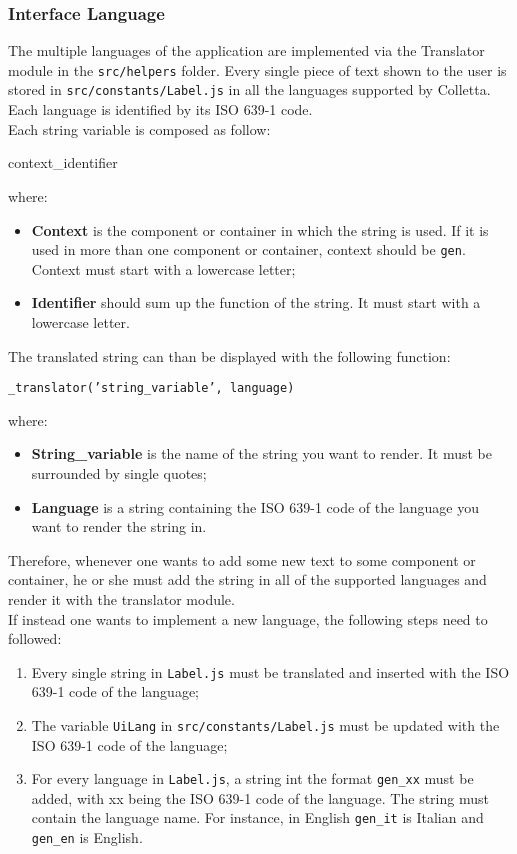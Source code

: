 \subsubsection{Interface Language}
The multiple languages of the application are implemented via the Translator module in the \texttt{src/helpers} folder. Every single piece of text shown to the user is stored in \texttt{src/constants/Label.js} in all the languages supported by Colletta. Each language is identified by its ISO 639-1 code.\\
Each string variable is composed as follow:
\begin{center}
context\_identifier
\end{center}
where:
\begin{itemize}
\item \textbf{Context} is the component or container in which the string is used. If it is used in more than one component or container, context should be \texttt{gen}. Context must start with a lowercase letter;
\item \textbf{Identifier} should sum up the function of the string. It must start with a lowercase letter.
\end{itemize}
The translated string can than be displayed with the following function:
\begin{center}
\texttt{\_translator('string\_variable', language)}
\end{center}
where:
\begin{itemize}
\item \textbf{String\_variable} is the name of the string you want to render. It must be surrounded by single quotes;
\item \textbf{Language} is a string containing the ISO 639-1 code of the language you want to render the string in.
\end{itemize}
Therefore, whenever one wants to add some new text to some component or container, he or she must add the string in all of the supported languages and render it with the translator module.\\
If instead one wants to implement a new language, the following steps need to followed:
\begin{enumerate}
\item Every single string in \texttt{Label.js} must be translated and inserted with the ISO 639-1 code of the language;
\item The variable \texttt{UiLang} in \texttt{src/constants/Label.js} must be updated with the ISO 639-1 code of the language;
\item For every language in \texttt{Label.js}, a string int the format \texttt{gen\_xx} must be added, with xx being the ISO 639-1 code of the language. The string must contain the language name. For instance, in English \texttt{gen\_it} is Italian and \texttt{gen\_en} is English.
\end{enumerate}
